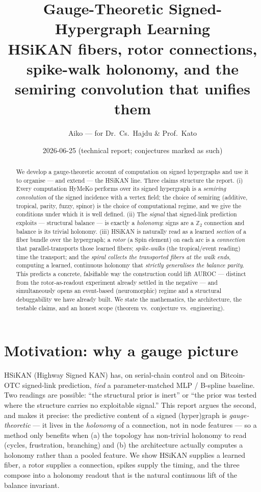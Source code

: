 \documentclass[11pt]{article}
\title{\textbf{Gauge-Theoretic Signed-Hypergraph Learning}\\[2pt]
\large HSiKAN fibers, rotor connections, spike-walk holonomy, and the semiring convolution that unifies them}
\author{Aiko --- for Dr.\ Cs.\ Hajdu \& Prof.\ Kato}
\date{2026-06-25 \quad(technical report; conjectures marked as such)}
\theoremstyle{definition}
\theoremstyle{plain}
\theoremstyle{remark}
\newcommand{\Spin}{\mathrm{Spin}}
\newcommand{\Z}{\mathbb{Z}}
\begin{document}
\maketitle
\begin{abstract}
We develop a gauge-theoretic account of computation on signed hypergraphs and use it to organise --- and extend ---
the HSiKAN line. Three claims structure the report. (i) Every computation HyMeKo performs over its signed
hypergraph is a \emph{semiring convolution} of the signed incidence with a vertex field; the choice of semiring
(additive, tropical, parity, fuzzy, spinor) is the choice of computational regime, and we give the conditions
under which it is well defined. (ii) The \emph{signal} that signed-link prediction exploits --- structural balance
--- is exactly a \emph{holonomy}: signs are a $\Z_2$ connection and balance is its trivial holonomy. (iii) HSiKAN
is naturally read as a learned \emph{section} of a fiber bundle over the hypergraph; a \emph{rotor} (a $\Spin$
element) on each arc is a \emph{connection} that parallel-transports those learned fibers; \emph{spike-walks}
(the tropical/event reading) time the transport; and the \emph{spiral collects the transported fibers at the
walk ends}, computing a learned, continuous holonomy that \emph{strictly generalises the balance parity}. This
predicts a concrete, falsifiable way the construction could lift AUROC --- distinct from the rotor-as-readout
experiment already settled in the negative --- and simultaneously opens an event-based (neuromorphic) regime and a
structural debuggability we have already built. We state the mathematics, the architecture, the testable claims,
and an honest scope (theorem vs.\ conjecture vs.\ engineering).
\end{abstract}

\tableofcontents

\section{Motivation: why a gauge picture}
HSiKAN (Highway Signed KAN) has, on serial-chain control and on Bitcoin-OTC signed-link prediction, \emph{tied} a
parameter-matched MLP / B-spline baseline. Two readings are possible: ``the structural prior is inert'' or ``the
prior was tested where the structure carries no exploitable signal.'' This report argues the second, and makes it
precise: the predictive content of a signed (hyper)graph is \emph{gauge-theoretic} --- it lives in the
\emph{holonomy} of a connection, not in node features --- so a method only benefits when (a) the topology has
non-trivial holonomy to read (cycles, frustration, branching) and (b) the architecture actually computes a
holonomy rather than a pooled feature. We show HSiKAN supplies a learned fiber, a rotor supplies a connection,
spikes supply the timing, and the three compose into a holonomy readout that is the natural continuous lift of the
balance invariant.
\end{document}
